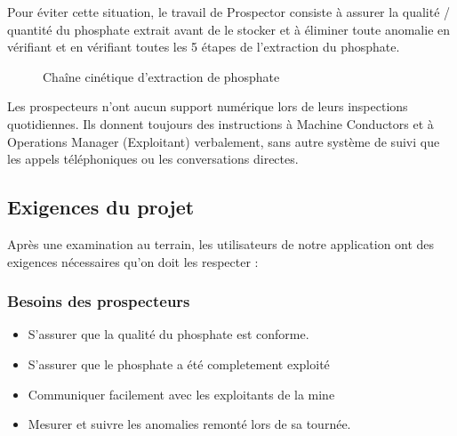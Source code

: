Pour \'eviter cette situation, le travail de Prospector consiste \`a assurer la qualit\'e / quantit\'e du phosphate extrait avant de le stocker et \`a \'eliminer toute anomalie en v\'erifiant et en v\'erifiant toutes les 5 \'etapes de l'extraction du phosphate.

\begin{figure}[!htb]
	\caption{\label{fig:my-label} Cha\^ine cin\'etique d'extraction de phosphate}
\end{figure}

Les prospecteurs n'ont aucun support num\'erique lors de leurs inspections quotidiennes. Ils donnent toujours des instructions \`a Machine Conductors et \`a Operations Manager (Exploitant) verbalement, sans autre syst\`eme de suivi que les appels t\'el\'ephoniques ou les conversations directes.

{\color{red}{Comment pouvons-nous aider les prospecteurs \`a relever et \`a garder trace des anomalies au cours de leur inspection quotidienne pour \'eviter les souillures au phosphate?}}

\subsection{Exigences du projet}
Apr\`es une examination au terrain, les utilisateurs de notre application ont des exigences n\'ecessaires qu'on doit les respecter :
\subsubsection{Besoins des prospecteurs}
\begin{itemize}
\item S'assurer que la qualit\'e du phosphate est conforme.
\item S'assurer que le phosphate a \'et\'e completement exploit\'e
\item Communiquer facilement avec les exploitants de la mine
\item Mesurer et suivre les anomalies remont\'e lors de sa tourn\'ee.
\end{itemize}
